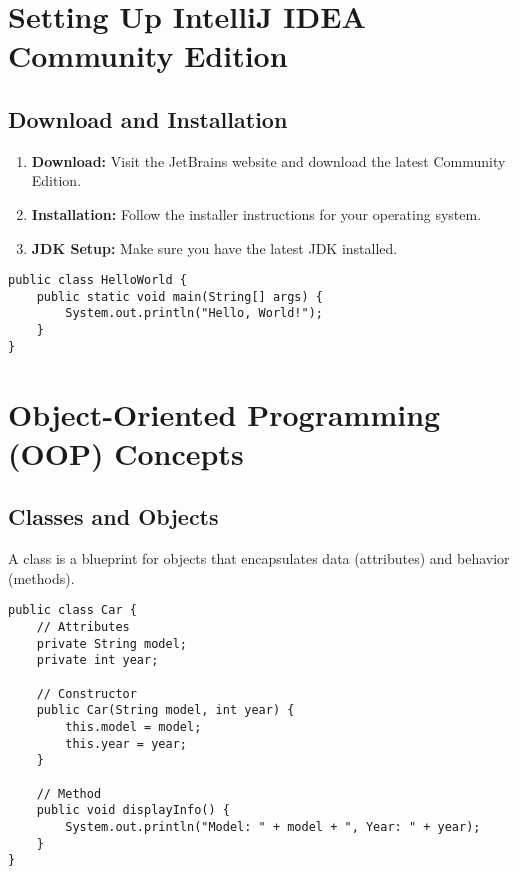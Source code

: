 \documentclass[11pt,a4paper]{article}
\begin{document}

\section{Setting Up IntelliJ IDEA Community Edition}

\subsection{Download and Installation}
\begin{enumerate}
    \item \textbf{Download:} Visit the JetBrains website and download the latest Community Edition.
    \item \textbf{Installation:} Follow the installer instructions for your operating system.
    \item \textbf{JDK Setup:} Make sure you have the latest JDK installed.
\end{enumerate}

\begin{lstlisting}[caption=Hello World Example]
public class HelloWorld {
    public static void main(String[] args) {
        System.out.println("Hello, World!");
    }
}
\end{lstlisting}


\section{Object-Oriented Programming (OOP) Concepts}

\subsection{Classes and Objects}
A class is a blueprint for objects that encapsulates data (attributes) and behavior (methods).

\begin{lstlisting}[caption=Car Class Example]
public class Car {
    // Attributes
    private String model;
    private int year;

    // Constructor
    public Car(String model, int year) {
        this.model = model;
        this.year = year;
    }

    // Method
    public void displayInfo() {
        System.out.println("Model: " + model + ", Year: " + year);
    }
}
\end{lstlisting}
\end{document}
